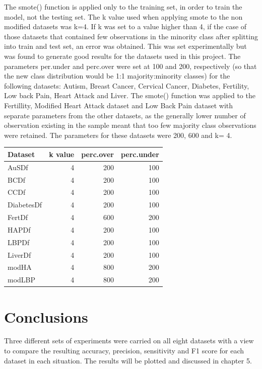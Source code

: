 The smote() function is applied only to the training set, in order to train the model,  not the testing set.\newline
The k value used when applying smote to the non modified datasets was k=4. If k was set to a value higher than 4, if the case of those datasets that contained few observations in the minority class after splitting into train and test set, an error was obtained. This was set experimentally but was found to generate good results for the datasets used in this project.\newline
The parameters per.under and perc.over were set at 100 and 200, respectively (so that the new class distribution would be 1:1 majority:minority classes) for the following datasets: Autism, Breast Cancer, Cervical Cancer, Diabetes, Fertility, Low back Pain, Heart Attack and Liver.
The smote() function was applied to the Fertillity, Modified Heart Attack dataset and Low Back Pain dataset with separate parameters from the other datasets, as the generally lower number of observation existing in the sample meant that too few majority class observations were retained. The parameters for these datasets were 200, 600 and k= 4.

\begin{table}[ht]
\centering
\begin{tabular}{lrrr}
  \hline
  \rowcolor{LightCyan}
Dataset & k value & perc.over & perc.under \\ 
  \hline
  AuSDf & 4 & 200 & 100  \\ 
  BCDf & 4 &  200 & 100 \\ 
  CCDf & 4 &  200 & 100\\ 
  DiabetesDf & 4 & 200 & 100 \\ 
  FertDf & 4 &  600 & 200 \\ 
  HAPDf & 4&  200 & 100 \\ 
  LBPDf & 4 &  200 & 100 \\ 
  LiverDf & 4 &  200 & 100 \\
  modHA & 4 & 800 & 200 \\
  modLBP & 4 & 800 & 200 \\
   \hline
\end{tabular}
\label{tab:smoteParam}
\end{table}




\section{Conclusions}
Three different sets of experiments were carried on all eight datasets with a view to compare the resulting accuracy, precision, sensitivity and F1 score for each dataset in each situation. The results will be plotted and discussed in chapter 5.


